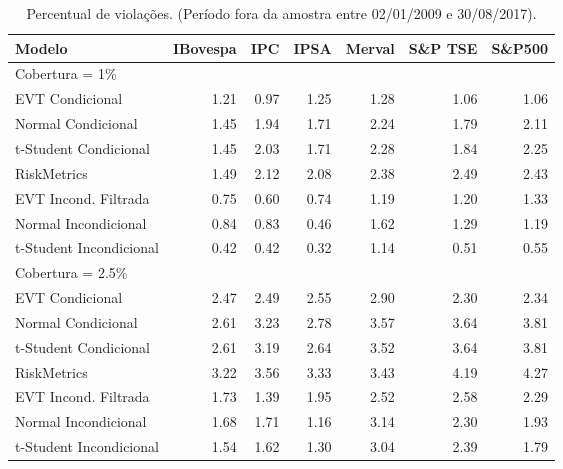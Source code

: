 \begin{table}[H]
\centering
\caption{Percentual de violações. (Período fora da amostra entre 02/01/2009 e 30/08/2017).} 
\label{tab:varviol}
\begin{tabular}{lrrrrrr}
  \hline
Modelo & IBovespa & IPC & IPSA & Merval & S\&P TSE & S\&P500 \\ 
  \hline
Cobertura = 1\% &  &  &  &  &  &  \\ 
  EVT Condicional & 1.21 & 0.97 & 1.25 & 1.28 & 1.06 & 1.06 \\ 
  Normal Condicional & 1.45 & 1.94 & 1.71 & 2.24 & 1.79 & 2.11 \\ 
  t-Student Condicional & 1.45 & 2.03 & 1.71 & 2.28 & 1.84 & 2.25 \\ 
  RiskMetrics & 1.49 & 2.12 & 2.08 & 2.38 & 2.49 & 2.43 \\ 
  EVT Incond. Filtrada & 0.75 & 0.60 & 0.74 & 1.19 & 1.20 & 1.33 \\ 
  Normal Incondicional & 0.84 & 0.83 & 0.46 & 1.62 & 1.29 & 1.19 \\ 
  t-Student Incondicional & 0.42 & 0.42 & 0.32 & 1.14 & 0.51 & 0.55 \\ 
  Cobertura = 2.5\% &  &  &  &  &  &  \\ 
  EVT Condicional & 2.47 & 2.49 & 2.55 & 2.90 & 2.30 & 2.34 \\ 
  Normal Condicional & 2.61 & 3.23 & 2.78 & 3.57 & 3.64 & 3.81 \\ 
  t-Student Condicional & 2.61 & 3.19 & 2.64 & 3.52 & 3.64 & 3.81 \\ 
  RiskMetrics & 3.22 & 3.56 & 3.33 & 3.43 & 4.19 & 4.27 \\ 
  EVT Incond. Filtrada & 1.73 & 1.39 & 1.95 & 2.52 & 2.58 & 2.29 \\ 
  Normal Incondicional & 1.68 & 1.71 & 1.16 & 3.14 & 2.30 & 1.93 \\ 
  t-Student Incondicional & 1.54 & 1.62 & 1.30 & 3.04 & 2.39 & 1.79 \\ 
   \hline
\end{tabular}
\end{table}
